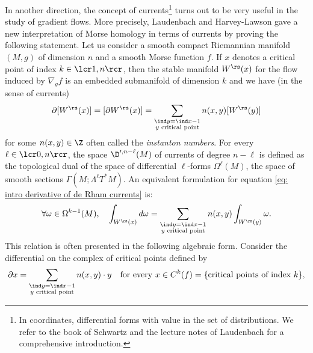 In another direction, the concept of currents\footnote{In coordinates, differential forms with value in the set of distributions. We refer to the book of Schwartz \cite{schwartz} and the lecture notes of Laudenbach \cite{laudenbach-book} for a comprehensive introduction.} turns out to be very useful in the study of gradient flows. More precisely, Laudenbach \cite{laudenbach} and Harvey-Lawson \cite{harvey-lawson} gave a new interpretation of Morse homology in terms of currents by proving the following statement. Let us consider a smooth compact Riemannian manifold $(M,g)$ of dimension $n$ and a smooth Morse function $f$. If $x$ denotes a critical point of index $k\in\lcr1,n\rcr$, then the stable manifold $W^\rs (x)$ for the flow induced by $\nabla_g f$ is an embedded submanifold of dimension $k$ and we have (in the sense of currents)
\begin{equation}\label{eq: intro derivative of de Rham currents}
\partial [W^\rs (x)] = [\partial W^\rs (x)] = \sum_{\substack{\ind y = \ind x - 1 \\ y \text{ critical point}}} n(x,y)[W^\rs (y)]
\end{equation}
for some $n(x,y) \in \Z$ often called the \textit{instanton numbers}. For every $\ell\in\lcr0,n\rcr$, the space $\D'^{,n-\ell} (M)$ of currents of degree $n-\ell$ is defined as the topological dual of the space of differential $\ell$-forms $\Omega^{\ell} (M)$, \ie the space of smooth sections $\Gamma (M; \Lambda^{\ell} T^* M)$. An equivalent formulation for equation \eqref{eq: intro derivative of de Rham currents} is:
\[
\forall \omega \in \Omega^{k-1} (M), \quad \int_{W^\rs(x)} d\omega = \sum_{\substack{\ind y = \ind x - 1 \\ y \text{ critical point}}} n(x,y) \int_{W^\rs (y)} \omega.
\]
This relation is often presented in the following algebraic form. Consider the differential on the complex of critical points defined by
\[
\partial x = \sum_{\substack{\ind y = \ind x - 1 \\y \text{ critical point}}} n(x,y)\cdot y \quad \text{for every }x \in C^k (f) = \{ \text{critical points of index }k \},
\]
